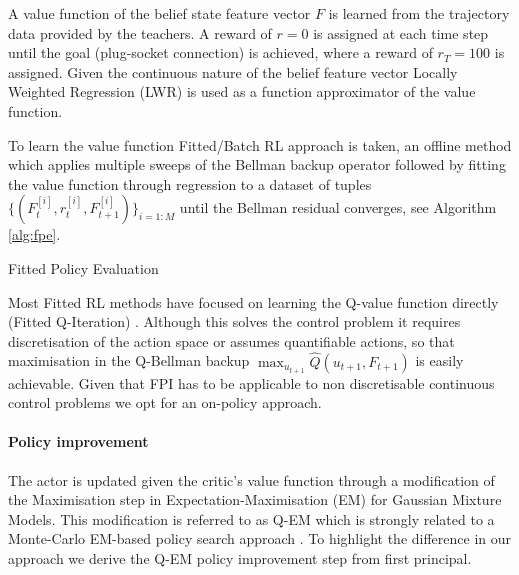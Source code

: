 \documentclass[final,5p,times,twocolumn]{elsarticle}
\makeatletter
\newcommand{\removelatexerror}{\let\@latex@error\@gobble}
\makeatother
\begin{document}
A value function of the belief state feature vector $F$ is  learned from the 
trajectory data provided by the teachers. A reward of ${r=0}$ is assigned at each time step until the goal (plug-socket connection) is achieved, where a 
reward of $r_{T}=100$ is assigned. Given the continuous nature of the belief feature vector Locally Weighted Regression
(LWR) \cite{Atkeson97locallyweighted}  is used as a function approximator of the value function.

To learn the value function Fitted/Batch RL approach is taken\cite{EGW05}, an offline method which applies multiple 
sweeps of the Bellman backup operator followed by fitting the value function through regression to a dataset of 
tuples $\{(F^{[i]}_t,r^{[i]}_t,F^{[i]}_{t+1})\}_{i=1:M}$ until the Bellman residual 
converges, see Algorithm \ref{alg:fpe}.

\begin{center}
\begin{minipage}{\linewidth}
\removelatexerror%
\begin{algorithm*}[H]
\label{alg:fpe}
\BlankLine
{}
\caption{Fitted Policy Evaluation}
\end{algorithm*} 
\end{minipage}
\end{center}

Most Fitted RL methods have focused on learning the Q-value function directly (Fitted Q-Iteration) 
\cite{NIPS2008_3501,EGW05,Riedmiller2005}. Although this solves the control problem it requires discretisation 
of the action space or assumes quantifiable actions, so that maximisation in the Q-Bellman backup
${\max_{u_{t+1}} \hat{Q}(u_{t+1},F_{t+1})}$ is easily achievable. Given that FPI has to be applicable to 
non discretisable continuous control problems we opt for an on-policy approach.

\paragraph{Policy improvement}

The actor is updated given the critic's value function through a modification of the Maximisation step in  Expectation-Maximisation (EM) 
for Gaussian Mixture Models. This modification is referred to as Q-EM which is strongly related to a Monte-Carlo EM-based policy 
search approach \cite[p.50]{p_search_surv_2011}. To highlight the difference in our approach we derive the Q-EM policy improvement step
from first principal.
\end{document}
